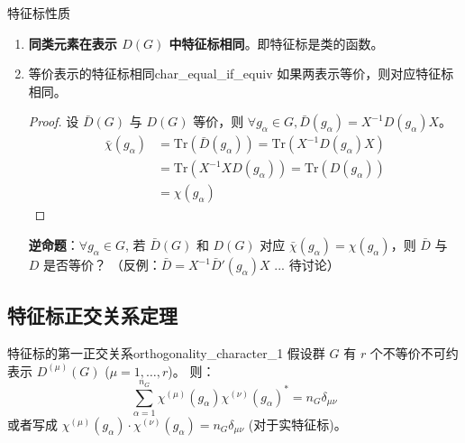 \begin{property}{特征标性质}
    \begin{enumerate}
        \item \textbf{同类元素在表示 $D(G)$ 中特征标相同}。即特征标是类的函数。
        \item
        \begin{theorem}{等价表示的特征标相同}{char_equal_if_equiv}
            如果两表示等价，则对应特征标相同。
        \end{theorem}
        \begin{proof}
            设 $\bar{D}(G)$ 与 $D(G)$ 等价，则 $\forall g_\alpha \in G, \bar{D}(g_\alpha) = X^{-1} D(g_\alpha) X$。
            \begin{equation}
                \begin{aligned}
                    \bar{\chi}(g_\alpha) &= \text{Tr}(\bar{D}(g_\alpha)) = \text{Tr}(X^{-1} D(g_\alpha) X) \\
                    &= \text{Tr}(X^{-1} X D(g_\alpha)) = \text{Tr}(D(g_\alpha)) \\
                    &= \chi(g_\alpha)
                \end{aligned}
            \end{equation}
        \end{proof}
        \textbf{逆命题}：$\forall g_\alpha \in G$, 若 $\bar{D}(G)$ 和 $D(G)$ 对应 $\bar{\chi}(g_\alpha) = \chi(g_\alpha)$，则 $\bar{D}$ 与 $D$ 是否等价？
        （反例：$\bar{D} = X^{-1} \bar{D}'(g_\alpha) X$ ... 待讨论）
    \end{enumerate}
\end{property}

\subsection{特征标正交关系定理}
\begin{theorem}{特征标的第一正交关系}{orthogonality_character_1}
    假设群 $G$ 有 $r$ 个不等价不可约表示 $D^{(\mu)}(G)$ ($\mu=1, \dots, r$)。
    则：
    \begin{equation}
        \sum_{\alpha=1}^{n_G} \chi^{(\mu)}(g_\alpha) \chi^{(\nu)}(g_\alpha)^* = n_G \delta_{\mu\nu}
    \end{equation}
    或者写成 $\chi^{(\mu)}(g_\alpha) \cdot \chi^{(\nu)}(g_\alpha) = n_G \delta_{\mu\nu}$ (对于实特征标)。
\end{theorem}

